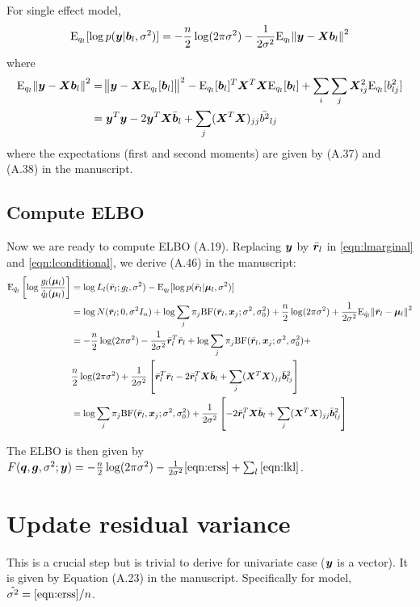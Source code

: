 For single effect model,
\begin{equation}
    \text{E}_{q_l}[\log p(\bm y|\bm b_l,\sigma^2)] = -\frac{n}{2}\log(2\pi\sigma^2) - \frac{1}{2\sigma^2}\text{E}_{q_l}\norm{\bm y - \bm X\bm b_l}^2  \label{eqn:lconditional}
\end{equation}
where
\begin{align}
    \text{E}_{q_l}\norm{\bm y - \bm X\bm b_l}^2 &= \norm{\bm y - \bm X \text{E}_{q_l}[\bm b_{l}]}^2 - \text{E}_{q_l}[\bm b_{l}]^T\bm X^T\bm X \text{E}_{q_l}[\bm b_{l}] + \sum_i \sum_j \bm X_{ij}^2 \text{E}_{q_l}[b_{lj}^2] \\
    &= \bm y^T\bm y -2 \bm y^T \bm X \bar{\bm{b}}_l  + \sum_j (\bm X^T \bm X)_{jj} \bar{b^2}_{lj}
\end{align}
where the expectations (first and second moments) are given by (A.37) and (A.38) in the manuscript. 

\subsection{Compute ELBO}
Now we are ready to compute ELBO (A.19).
Replacing $\bm y$ by $\bar{\bm r}_l$ in \eqref{eqn:lmarginal} and \eqref{eqn:lconditional}, we derive (A.46) in the manuscript:
\begin{align}
    \text{E}_{\hat{q}_l} \left[ \log \frac{g_l(\bm \mu_l)}{\hat{q}_l(\bm \mu_l)} \right] &= \log L_l(\bar{\bm r}_l; g_l,\sigma^2) - \text{E}_{q_l}[\log p(\bar{\bm r}_l|\bm \mu_l,\sigma^2)]  \\
    &= \log N(\bar{\bm r}_l; 0, \sigma^2 I_n) + \log \sum_j \pi_j \text{BF}(\bar{\bm r}_l, \bm x_j; \sigma^2, \sigma^2_0) + \frac{n}{2} \log(2\pi\sigma^2) +\frac{1}{2\sigma^2}\text{E}_{\hat{q}_l}\norm{\bar{\bm r}_l-\bm \mu_l}^2 \\
    &= -\frac{n}{2} \log(2\pi\sigma^2) -\frac{1}{2\sigma^2}\bar{\bm r}_l^T\bar{\bm r}_l + \log \sum_j \pi_j \text{BF}(\bar{\bm r}_l, \bm x_j; \sigma^2, \sigma^2_0) + \\
    & \frac{n}{2} \log(2\pi\sigma^2) +\frac{1}{2\sigma^2}\left[\bar{\bm r}_l^T\bar{\bm r}_l - 2\bar{\bm r}_l^T\bm X \bar{\bm b}_l + \sum_j (\bm X^T \bm X)_{jj} \bar{\bm b}_{lj}^2 \right] \\
    &= \log \sum_j \pi_j \text{BF}(\bar{\bm r}_l, \bm x_j; \sigma^2, \sigma^2_0) + \frac{1}{2\sigma^2}\left[- 2\bar{\bm r}_l^T\bm X \bar{\bm b}_l + \sum_j (\bm X^T \bm X)_{jj} \bar{\bm b}_{lj}^2\right] \label{eqn:lkl}
\end{align}

The ELBO is then given by $F({\bm q},\bm g,\sigma^2; \bm y) = -\frac{n}{2} \log(2\pi\sigma^2) - \frac{1}{2\sigma^2} \eqref{eqn:erss} + \sum_l \eqref{eqn:lkl}$.

\section{Update residual variance}
This is a crucial step but is trivial to derive for univariate case ($\bm y$ is a vector). It is given by Equation (A.23) in the manuscript. Specifically for \susie model, $\hat{\sigma^2} = \eqref{eqn:erss}/n$.

